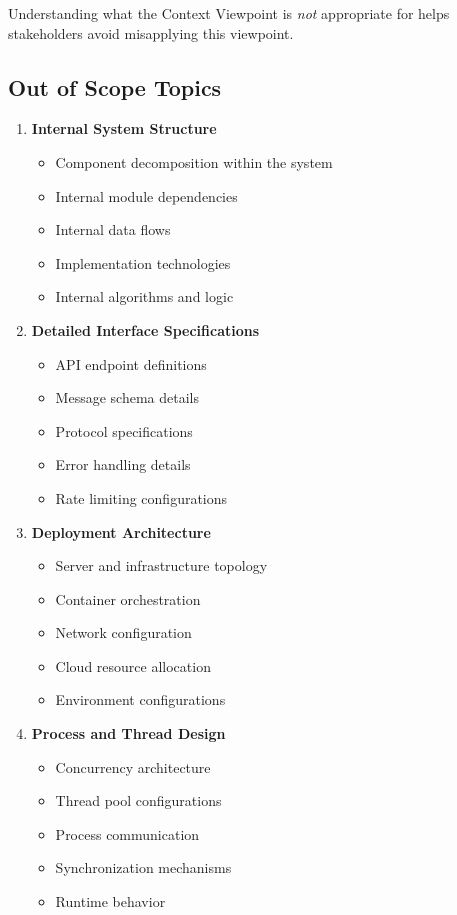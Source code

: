 \documentclass[11pt,letterpaper]{article}
\begin{document}
Understanding what the Context Viewpoint is \emph{not} appropriate for helps stakeholders avoid misapplying this viewpoint.

\subsection{Out of Scope Topics}

\begin{enumerate}[label=\textbf{AC\arabic*:}, leftmargin=2.5em]
    \item \textbf{Internal System Structure}
    \begin{itemize}[nosep]
        \item Component decomposition within the system
        \item Internal module dependencies
        \item Internal data flows
        \item Implementation technologies
        \item Internal algorithms and logic
    \end{itemize}
    
    \item \textbf{Detailed Interface Specifications}
    \begin{itemize}[nosep]
        \item API endpoint definitions
        \item Message schema details
        \item Protocol specifications
        \item Error handling details
        \item Rate limiting configurations
    \end{itemize}
    
    \item \textbf{Deployment Architecture}
    \begin{itemize}[nosep]
        \item Server and infrastructure topology
        \item Container orchestration
        \item Network configuration
        \item Cloud resource allocation
        \item Environment configurations
    \end{itemize}
    
    \item \textbf{Process and Thread Design}
    \begin{itemize}[nosep]
        \item Concurrency architecture
        \item Thread pool configurations
        \item Process communication
        \item Synchronization mechanisms
        \item Runtime behavior
    \end{itemize}
    

\end{enumerate}
\end{document}
